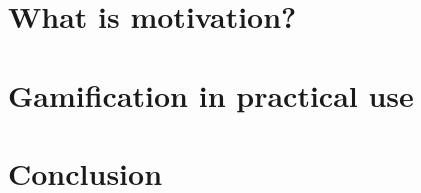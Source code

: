\documentclass[10pt,twoside,english,a4paper]{article}
\begin{document}
\section{What is motivation?} \label{section4}




\section{Gamification in practical use} \label{section5}




\section{Conclusion} \label{section6}






\end{document}

